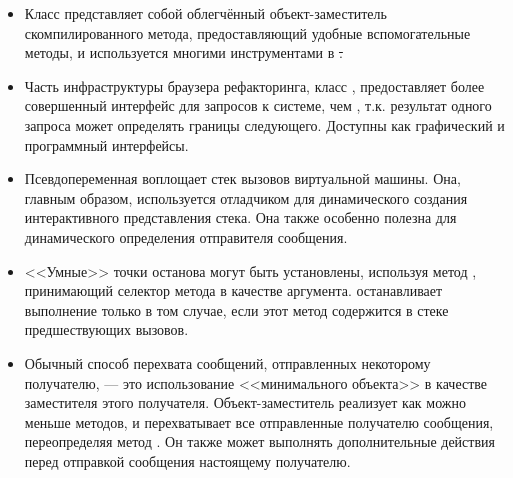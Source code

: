 \documentclass[a4paper,10pt,twoside]{book}
\begin{document}
\begin{itemize}
\item Класс  представляет собой облегчённый объект-заместитель скомпилированного метода, предоставляющий удобные вспомогательные методы, и используется многими инструментами в \st.
\item Часть инфраструктуры браузера рефакторинга, класс , предоставляет более совершенный интерфейс для запросов к системе, чем , т.к. результат одного запроса может определять границы следующего. Доступны как графический и программный интерфейсы.
\item Псевдопеременная  воплощает стек вызовов виртуальной машины. Она, главным образом, используется отладчиком для динамического создания интерактивного представления стека. Она также особенно полезна для динамического определения отправителя сообщения.
\item <<Умные>> точки останова могут быть установлены, используя метод , принимающий селектор метода в качестве аргумента.  останавливает выполнение только в том случае, если этот метод содержится в стеке предшествующих вызовов.
\item Обычный способ перехвата сообщений, отправленных некоторому получателю, --- это использование <<минимального объекта>> в качестве заместителя этого получателя. Объект-заместитель реализует как можно меньше методов, и перехватывает все отправленные получателю сообщения, переопределяя метод . Он также может выполнять дополнительные действия перед отправкой сообщения настоящему получателю.

\end{itemize}
\end{document}
